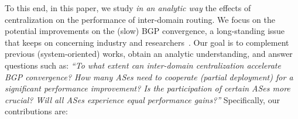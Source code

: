 To this end, in this paper, we study \textit{in an analytic way} the effects of centralization on the performance of inter-domain routing. We focus on the potential improvements on the (slow) BGP convergence, a long-standing issue that keeps on concerning industry and researchers~\cite{survey-bgp-nanog}. Our goal is to complement previous (system-oriented) works, obtain an analytic understanding, and answer questions such as: \textit{``To what extent can inter-domain centralization accelerate BGP convergence? How many ASes need to cooperate (partial deployment) for a significant performance improvement? Is the participation of certain ASes more crucial? Will all ASes experience equal performance gains?''} Specifically, our contributions are:





